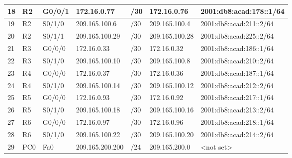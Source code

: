 \documentclass[12pt,a4paper]{report}
\begin{document}
\begin{center}
\begin{longtable}{|p{}|p{}|p{}|p{}|p{}|p{}|p{}|}
\hline  18  &  R2  &  G0/0/1  &  172.16.0.77  &  /30  &  172.16.0.76  &  2001:db8:acad:178::1/64 \\
\hline  19  &  R2  &  S0/1/0  &  209.165.100.6  &  /30  &  209.165.100.4  &  2001:db8:acad:211::2/64 \\
\hline  20  &  R2  &  S0/1/1  &  209.165.100.29  &  /30  &  209.165.100.28  &  2001:db8:acad:225::2/64 \\
\hline  21  &  R3  &  G0/0/0  &  172.16.0.33  &  /30  &  172.16.0.32  &  2001:db8:acad:186::1/64 \\
\hline  22  &  R3  &  S0/1/0  &  209.165.100.10  &  /30  &  209.165.100.8  &  2001:db8:acad:210::2/64 \\
\hline  23  &  R4  &  G0/0/0  &  172.16.0.37  &  /30  &  172.16.0.36  &  2001:db8:acad:187::1/64 \\
\hline  24  &  R4  &  S0/1/0  &  209.165.100.14  &  /30  &  209.165.100.12  &  2001:db8:acad:212::2/64 \\
\hline  25  &  R5  &  G0/0/0  &  172.16.0.93  &  /30  &  172.16.0.92  &  2001:db8:acad:217::1/64 \\
\hline  26  &  R5  &  S0/1/0  &  209.165.100.18  &  /30  &  209.165.100.16  &  2001:db8:acad:213::2/64 \\
\hline  27  &  R6  &  G0/0/0  &  172.16.0.97  &  /30  &  172.16.0.96  &  2001:db8:acad:218::1/64 \\
\hline  28  &  R6  &  S0/1/0  &  209.165.100.22  &  /30  &  209.165.100.20  &  2001:db8:acad:214::2/64 \\
\hline  29  &  PC0  &  Fa0  &  209.165.200.200  &  /24  &  209.165.200.0  &  <not set> \\
			

\end{longtable}
\end{center}
\end{document}
